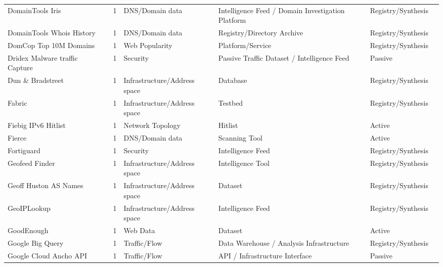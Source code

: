 \documentclass[11pt,a4paper]{article}
\begin{document}
\begin{longtable}{@{}p{}p{}p{}p{}p{}p{}p{}@{}}
DomainTools Iris & \cite{domaintools-iris} & 1 & DNS/Domain data & Intelligence Feed / Domain Investigation Platform & Registry/Synthesis & \cite{10.1145/3517745.3561425} \\
DomainTools Whois History & \cite{domaintools-whois} & 1 & DNS/Domain data & Registry/Directory Archive & Registry/Synthesis & \cite{10.1145/3487552.3487816} \\
DomCop Top 10M Domains & \cite{domcop} & 1 & Web Popularity & Platform/Service & Registry/Synthesis & \cite{10.1145/3777912.3839797} \\
Dridex Malware traffic Capture & \cite{dridex-malware-traffic} & 1 & Security & Passive Traffic Dataset / Intelligence Feed & Passive & \cite{10.1007/978-3-031-28486-1_5} \\
Dun \& Bradstreet & \cite{dnb} & 1 & Infrastructure/Address space & Database & Registry/Synthesis & \cite{10.1145/3487552.3487853} \\
Fabric & \cite{fabric-framework} & 1 & Infrastructure/Address space & Testbed & Registry/Synthesis & \cite{10.1145/3646547.3688441} \\
Fiebig IPv6 Hitlist & \cite{fiebig-ipv6} & 1 & Network Topology & Hitlist & Active & \cite{10.1145/3646547.3688420} \\
Fierce & \cite{fierce-scanner} & 1 & DNS/Domain data & Scanning Tool & Active & \cite{10.1007/978-3-031-56249-5_4} \\
Fortiguard & \cite{fortiguard} & 1 & Security & Intelligence Feed & Registry/Synthesis & \cite{10.1145/3777912.3839787} \\
Geofeed Finder & \cite{geofeed_finder} & 1 & Infrastructure/Address space & Intelligence Tool & Registry/Synthesis & \cite{10.1007/978-3-031-56252-5_11} \\
Geoff Huston AS Names & \cite{huston_as_names} & 1 & Infrastructure/Address space & Dataset & Registry/Synthesis & \cite{10.1007/978-3-030-98785-5_9} \\
GeoIPLookup & \cite{geoip_lookup} & 1 & Infrastructure/Address space & Intelligence Feed & Registry/Synthesis & \cite{10.1145/3487552.3487854} \\
GoodEnough & \cite{goodenough} & 1 & Web Data & Dataset & Active & \cite{10.1007/978-3-032-18268-5_13} \\
Google Big Query & \cite{google_bigquery} & 1 & Traffic/Flow & Data Warehouse / Analysis Infrastructure & Registry/Synthesis & \cite{10.1007/978-3-030-98785-5_30} \\
Google Cloud Ancho API & \cite{google_ancho_api} & 1 & Traffic/Flow & API / Infrastructure Interface & Passive & \cite{10.1007/978-3-030-98785-5_8} \\

\end{longtable}
\end{document}
